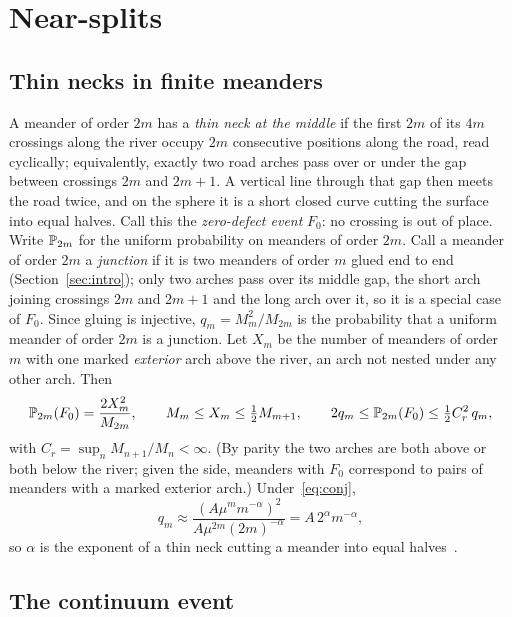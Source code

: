 \section{Near-splits}\label{sec:nearsplit}

\subsection{Thin necks in finite meanders}

A meander of order $2m$ has a \emph{thin neck at the middle} if the first $2m$ of its $4m$
crossings along the river occupy $2m$ consecutive positions along the road, read cyclically;
equivalently, exactly two road arches pass over or under the gap between crossings $2m$ and
$2m+1$. A vertical line through that gap then meets the road twice, and on the sphere it is a short
closed curve cutting the surface into equal halves. Call this the \emph{zero-defect event} $F_0$:
no crossing is out of place. Write $\mathbb{P}_{2m}$ for the uniform probability on meanders of order
$2m$. Call a meander of order $2m$ a \emph{junction} if it is two meanders of order $m$ glued end
to end (Section~\ref{sec:intro}); only two arches pass over its middle gap, the short arch
joining crossings $2m$ and $2m+1$ and the long arch over it, so it is a special case of $F_0$. Since gluing
is injective, $q_m=M_m^2/M_{2m}$ is the probability that a uniform meander of order $2m$ is a
junction. Let $X_m$
be the number of meanders of order $m$ with one marked \emph{exterior} arch above the river, an
arch not nested under any other arch. Then
\begin{equation}\label{eq:F0}
\mathbb{P}_{2m}(F_0)=\frac{2X_m^2}{M_{2m}},\qquad M_m\le X_m\le\tfrac12M_{m+1},\qquad
2q_m\le\mathbb{P}_{2m}(F_0)\le\tfrac12C_r^2\,q_m ,
\end{equation}
with $C_r=\sup_nM_{n+1}/M_n<\infty$. (By parity the two arches are both above or both below the
river; given the side, meanders with $F_0$ correspond to pairs of meanders with a marked exterior
arch.) Under~\eqref{eq:conj},
\[
q_m\approx\frac{(A\mu^mm^{-\alpha})^2}{A\mu^{2m}(2m)^{-\alpha}}=A\,2^\alpha m^{-\alpha},
\]
so $\alpha$ is the exponent of a thin neck cutting a meander into equal halves~\cite{PaperA}.

\subsection{The continuum event}

